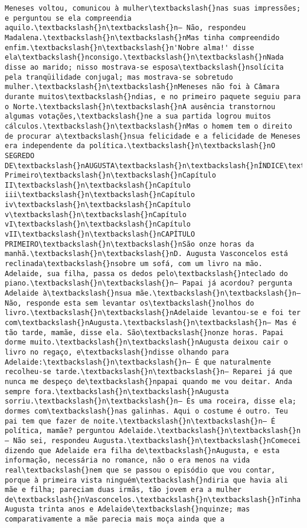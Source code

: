 \documentclass[11pt]{article}
\begin{document}
\begin{Verbatim}[commandchars=\\\{\}]
Meneses voltou, comunicou à mulher\textbackslash{}nas suas impressões; e perguntou se ela compreendia aquilo.\textbackslash{}n\textbackslash{}n— Não, respondeu Madalena.\textbackslash{}n\textbackslash{}nMas tinha compreendido enfim.\textbackslash{}n\textbackslash{}n'Nobre alma!' disse ela\textbackslash{}nconsigo.\textbackslash{}n\textbackslash{}nNada disse ao marido; nisso mostrava-se esposa\textbackslash{}nsolícita pela tranqüilidade conjugal; mas mostrava-se sobretudo mulher.\textbackslash{}n\textbackslash{}nMeneses não foi à Câmara durante muitos\textbackslash{}ndias, e no primeiro paquete seguiu para o Norte.\textbackslash{}n\textbackslash{}nA ausência transtornou algumas votações,\textbackslash{}ne a sua partida logrou muitos cálculos.\textbackslash{}n\textbackslash{}nMas o homem tem o direito de procurar a\textbackslash{}nsua felicidade e a felicidade de Meneses era independente da política.\textbackslash{}n\textbackslash{}nO SEGREDO DE\textbackslash{}nAUGUSTA\textbackslash{}n\textbackslash{}nÍNDICE\textbackslash{}n\textbackslash{}nCapítulo Primeiro\textbackslash{}n\textbackslash{}nCapítulo II\textbackslash{}n\textbackslash{}nCapítulo iii\textbackslash{}n\textbackslash{}nCapítulo iv\textbackslash{}n\textbackslash{}nCapítulo v\textbackslash{}n\textbackslash{}nCapítulo vI\textbackslash{}n\textbackslash{}nCapítulo vII\textbackslash{}n\textbackslash{}nCAPÍTULO PRIMEIRO\textbackslash{}n\textbackslash{}nSão onze horas da manhã.\textbackslash{}n\textbackslash{}nD. Augusta Vasconcelos está reclinada\textbackslash{}nsobre um sofá, com um livro na mão. Adelaide, sua filha, passa os dedos pelo\textbackslash{}nteclado do piano.\textbackslash{}n\textbackslash{}n— Papai já acordou? pergunta Adelaide à\textbackslash{}nsua mãe.\textbackslash{}n\textbackslash{}n— Não, responde esta sem levantar os\textbackslash{}nolhos do livro.\textbackslash{}n\textbackslash{}nAdelaide levantou-se e foi ter com\textbackslash{}nAugusta.\textbackslash{}n\textbackslash{}n— Mas é tão tarde, mamãe, disse ela. São\textbackslash{}nonze horas. Papai dorme muito.\textbackslash{}n\textbackslash{}nAugusta deixou cair o livro no regaço, e\textbackslash{}ndisse olhando para Adelaide:\textbackslash{}n\textbackslash{}n— É que naturalmente recolheu-se tarde.\textbackslash{}n\textbackslash{}n— Reparei já que nunca me despeço de\textbackslash{}npapai quando me vou deitar. Anda sempre fora.\textbackslash{}n\textbackslash{}nAugusta sorriu.\textbackslash{}n\textbackslash{}n— És uma roceira, disse ela; dormes com\textbackslash{}nas galinhas. Aqui o costume é outro. Teu pai tem que fazer de noite.\textbackslash{}n\textbackslash{}n— É política, mamãe? perguntou Adelaide.\textbackslash{}n\textbackslash{}n— Não sei, respondeu Augusta.\textbackslash{}n\textbackslash{}nComecei dizendo que Adelaide era filha de\textbackslash{}nAugusta, e esta informação, necessária no romance, não o era menos na vida real\textbackslash{}nem que se passou o episódio que vou contar, porque à primeira vista ninguém\textbackslash{}ndiria que havia ali mãe e filha; pareciam duas irmãs, tão jovem era a mulher de\textbackslash{}nVasconcelos.\textbackslash{}n\textbackslash{}nTinha Augusta trinta anos e Adelaide\textbackslash{}nquinze; mas comparativamente a mãe parecia mais moça ainda que a 
\end{Verbatim}
\end{document}
